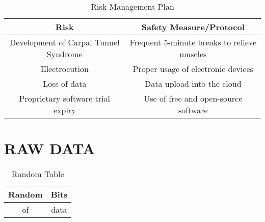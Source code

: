 \documentclass{strrespaper-trad}
\begin{document}
\begin{landscape}
	        \begin{table}[htbp]
	            \centering
	            \caption{Risk Management Plan}
	            \label{tab:risk_management}
	            \begin{tabularx}{\textwidth}{cc}
	                \toprule
	                Risk                                  & Safety Measure/Protocol                     \\
	                \midrule
	                Development of Carpal Tunnel Syndrome & Frequent 5-minute breaks to relieve muscles \\
	                Electrocution                         & Proper usage of electronic devices          \\
	                Loss of data                          & Data upload into the cloud                  \\
	                Proprietary software trial expiry     & Use of free and open-source software        \\
	                \bottomrule
	            \end{tabularx}
	        \end{table}
	    \end{landscape}

    \section{RAW DATA}
	    \begin{table}[htbp]
	        \centering
	        \begin{tabular}{cc}
	            \toprule
	            Random & Bits \\
	            \midrule
	            of     & data \\
	            \bottomrule
	        \end{tabular}
	        \caption{Random Table}
	        \label{tab:random}
	    \end{table}
	    \lstset{language=Python, breaklines=true, numbers=left, stringstyle=\ttfamily\small, basicstyle=\singlespacing}

	    
\end{document}
